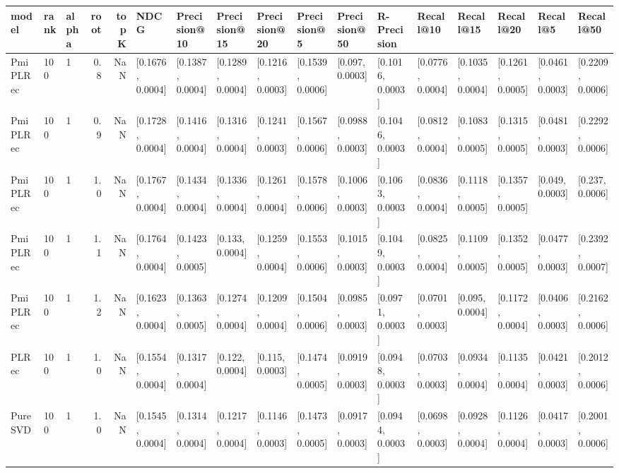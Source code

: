 \begin{tabular}{lllrrllllllllllll}
\toprule
     model & rank & alpha &  root &  topK &              NDCG &      Precision@10 &      Precision@15 &      Precision@20 &       Precision@5 &      Precision@50 &       R-Precision &         Recall@10 &         Recall@15 &         Recall@20 &          Recall@5 &         Recall@50 \\
\midrule
  PmiPLRec &  100 &     1 &   0.8 &   NaN &  [0.1676, 0.0004] &  [0.1387, 0.0004] &  [0.1289, 0.0004] &  [0.1216, 0.0003] &  [0.1539, 0.0006] &   [0.097, 0.0003] &  [0.1016, 0.0003] &  [0.0776, 0.0004] &  [0.1035, 0.0004] &  [0.1261, 0.0005] &  [0.0461, 0.0003] &  [0.2209, 0.0006] \\
  PmiPLRec &  100 &     1 &   0.9 &   NaN &  [0.1728, 0.0004] &  [0.1416, 0.0004] &  [0.1316, 0.0004] &  [0.1241, 0.0003] &  [0.1567, 0.0006] &  [0.0988, 0.0003] &  [0.1046, 0.0003] &  [0.0812, 0.0004] &  [0.1083, 0.0005] &  [0.1315, 0.0005] &  [0.0481, 0.0003] &  [0.2292, 0.0006] \\
  PmiPLRec &  100 &     1 &   1.0 &   NaN &  [0.1767, 0.0004] &  [0.1434, 0.0004] &  [0.1336, 0.0004] &  [0.1261, 0.0004] &  [0.1578, 0.0006] &  [0.1006, 0.0003] &  [0.1063, 0.0003] &  [0.0836, 0.0004] &  [0.1118, 0.0005] &  [0.1357, 0.0005] &   [0.049, 0.0003] &   [0.237, 0.0006] \\
  PmiPLRec &  100 &     1 &   1.1 &   NaN &  [0.1764, 0.0004] &  [0.1423, 0.0005] &   [0.133, 0.0004] &  [0.1259, 0.0004] &  [0.1553, 0.0006] &  [0.1015, 0.0003] &  [0.1049, 0.0003] &  [0.0825, 0.0004] &  [0.1109, 0.0005] &  [0.1352, 0.0005] &  [0.0477, 0.0003] &  [0.2392, 0.0007] \\
  PmiPLRec &  100 &     1 &   1.2 &   NaN &  [0.1623, 0.0004] &  [0.1363, 0.0005] &  [0.1274, 0.0004] &  [0.1209, 0.0004] &  [0.1504, 0.0006] &  [0.0985, 0.0003] &  [0.0971, 0.0003] &  [0.0701, 0.0003] &   [0.095, 0.0004] &  [0.1172, 0.0004] &  [0.0406, 0.0003] &  [0.2162, 0.0006] \\
     PLRec &  100 &     1 &   1.0 &   NaN &  [0.1554, 0.0004] &  [0.1317, 0.0004] &   [0.122, 0.0004] &   [0.115, 0.0003] &  [0.1474, 0.0005] &  [0.0919, 0.0003] &  [0.0948, 0.0003] &  [0.0703, 0.0003] &  [0.0934, 0.0004] &  [0.1135, 0.0004] &  [0.0421, 0.0003] &  [0.2012, 0.0006] \\
   PureSVD &  100 &     1 &   1.0 &   NaN &  [0.1545, 0.0004] &  [0.1314, 0.0004] &  [0.1217, 0.0004] &  [0.1146, 0.0003] &  [0.1473, 0.0005] &  [0.0917, 0.0003] &  [0.0944, 0.0003] &  [0.0698, 0.0003] &  [0.0928, 0.0004] &  [0.1126, 0.0004] &  [0.0417, 0.0003] &  [0.2001, 0.0006] \\

\end{tabular}
